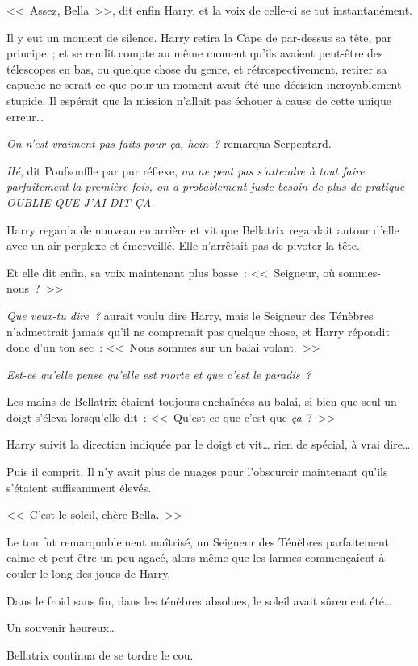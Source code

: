 <<~Assez, Bella~>>, dit enfin Harry, et la voix de celle-ci se tut instantanément.

Il y eut un moment de silence. Harry retira la Cape de par-dessus sa tête, par principe~; et se rendit compte au même moment qu'ils avaient peut-être des télescopes en bas, ou quelque chose du genre, et rétrospectivement, retirer sa capuche ne serait-ce que pour un moment avait été une décision incroyablement stupide. Il espérait que la mission n'allait pas échouer à cause de cette unique erreur…

\emph{On n'est vraiment pas faits pour ça, hein~?} remarqua Serpentard.

\emph{Hé}, dit Poufsouffle par pur réflexe, \emph{on ne peut pas s'attendre à tout faire parfaitement la première fois, on a probablement juste besoin de plus de pratique OUBLIE QUE J'AI DIT ÇA.}

Harry regarda de nouveau en arrière et vit que Bellatrix regardait autour d'elle avec un air perplexe et émerveillé. Elle n'arrêtait pas de pivoter la tête.

Et elle dit enfin, sa voix maintenant plus basse~: <<~Seigneur, où sommes-nous~?~>>

\emph{Que veux-tu dire~?} aurait voulu dire Harry, mais le Seigneur des Ténèbres n'admettrait jamais qu'il ne comprenait pas quelque chose, et Harry répondit donc d'un ton sec~: <<~Nous sommes sur un balai volant.~>>

\emph{Est-ce qu'elle pense qu'elle est morte et que c'est le paradis~?}

Les mains de Bellatrix étaient toujours enchaînées au balai, si bien que seul un doigt s'éleva lorsqu'elle dit~: <<~Qu'est-ce que c'est que \emph{ça}~?~>>

Harry suivit la direction indiquée par le doigt et vit… rien de spécial, à vrai dire…

Puis il comprit. Il n'y avait plus de nuages pour l'obscurcir maintenant qu'ils s'étaient suffisamment élevés.

<<~C'est le soleil, chère Bella.~>>

Le ton fut remarquablement maîtrisé, un Seigneur des Ténèbres parfaitement calme et peut-être un peu agacé, alors même que les larmes commençaient à couler le long des joues de Harry.

Dans le froid sans fin, dans les ténèbres absolues, le soleil avait sûrement été…

Un souvenir heureux…

Bellatrix continua de se tordre le cou.


